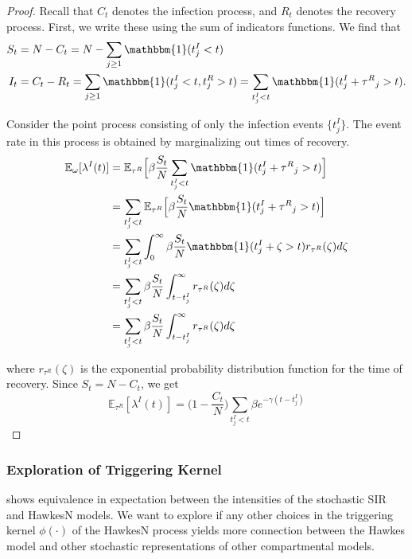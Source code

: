 \documentclass[12pt]{article}
\begin{document}
\begin{proof} Recall that $C_t$ denotes the infection process, and $R_t$ denotes the recovery process. First, we write these using the sum of indicators functions. We find that
\begin{align*}
S_t &= N - C_t = N - \sum_{j\geq 1} \mathbbm{1} (t_j^I < t) \\
I_t &= C_t - R_t = \sum_{j\geq 1} \mathbbm{1} (t_j^I < t, t_j^R > t) = \sum_{t_j^I < t} \mathbbm{1} (t_j^I + {\tau^R}_j > t). 
\end{align*} 
 
Consider the point process consisting of only the infection events $\{t_j^I\}$. The event rate in this process is obtained by marginalizing out times of recovery. 
\begin{align*}
\mathbb{E}_\omega [ \lambda^I (t)] 
&= \mathbb{E}_{\tau^R} \Big [\beta \frac{S_t}{N} \sum_{t_j^I < t} \mathbbm{1} (t_j^I + {\tau^R}_j > t) \Big ]\\ 
&= \sum_{t_j^I < t} \mathbb{E}_{\tau^R} \Big [\beta \frac{S_t}{N}  \mathbbm{1} (t_j^I + {\tau^R}_j > t) \Big ]\\
&= \sum_{t_j^I < t}\int_0^\infty \beta \frac{S_t}{N}  \mathbbm{1} (t_j^I + \zeta > t) r_{\tau^R}(\zeta) d\zeta \\
&= \sum_{t_j^I < t} \beta \frac{S_t}{N} \int_{t - t_j^I}^\infty r_{\tau^R}(\zeta) d\zeta \\
&= \sum_{t_j^I < t} \beta \frac{S_t}{N} \int_{t - t_j^I}^\infty r_{\tau^R}(\zeta) d\zeta
\end{align*}
 
where $r_{\tau^R}(\zeta)$ is the exponential probability distribution function for the time of recovery. Since $S_t = N - C_t$, we get
\[
\mathbb{E}_{\tau^R} [ \lambda^I (t)] = \Big (1 - \frac{C_t}{N} \Big ) \sum_{t_j^I < t}  \beta e^{- \gamma (t - t_j^I)}
\] 
 
 
 
\end{proof}








\subsubsection{Exploration of Triggering Kernel}

\cite{Rizoiu2018} shows equivalence in expectation between the intensities of the stochastic SIR and HawkesN models. We want to explore if any other choices in the triggering kernel $\phi(\cdot )$ of the HawkesN process yields more connection between the Hawkes model and other stochastic representations of other compartmental models. 
\end{document}
